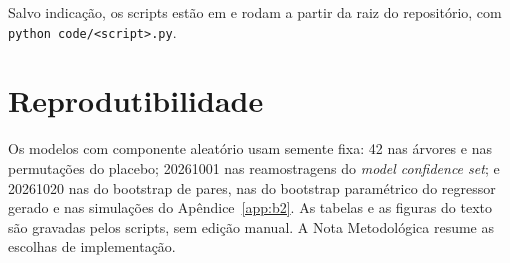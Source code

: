 Salvo indicação, os scripts estão em  e rodam a partir da raiz
do repositório, com \texttt{python code/<script>.py}.

\section{Reprodutibilidade}

Os modelos com componente aleatório usam semente fixa: 42 nas árvores e nas
permutações do placebo; 20261001 nas reamostragens do \textit{model
confidence set}; e 20261020 nas do bootstrap de pares, nas do bootstrap
paramétrico do regressor gerado e nas simulações do Apêndice~\ref{app:b2}. As
tabelas e as figuras do texto são gravadas pelos scripts, sem edição manual.
A Nota Metodológica resume as escolhas de implementação.
